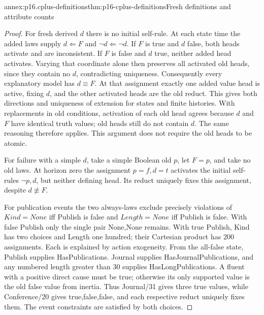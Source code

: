 \begin{annexitem}{annex:p16.cplus-definitions}{thm:p16-cplus-definitions}{Fresh definitions and attribute counts}
\begin{proof}
For fresh derived \(d\) there is no initial self-rule.
At each state time the added laws supply \(d\Leftarrow F\) and
\(\neg d\Leftarrow\neg d\). If \(F\) is true and \(d\) false,
both heads activate and are inconsistent.
If \(F\) is false and \(d\) true, neither added head activates.
Varying that coordinate alone then preserves all activated old
heads, since they contain no \(d\), contradicting uniqueness.
Consequently every explanatory model has \(d\equiv F\).
At that assignment exactly one added value head is active, fixing
\(d\), and the other activated heads are the old reduct.
This gives both directions and uniqueness of extension for states
and finite histories. With replacements in old conditions, activation
of each old head agrees because \(d\) and \(F\) have identical truth
values; old heads still do not contain \(d\). The same reasoning
therefore applies. This argument does not require the old heads to
be atomic.

For failure with a simple \(d\), take a simple Boolean old \(p\),
let \(F=p\), and take no old laws. At horizon zero the assignment
\(p=f,d=t\) activates the initial self-rules \(\neg p,d\), but
neither defining head. Its reduct uniquely fixes this assignment,
despite \(d\not\equiv F\).

For publication events the two always-laws exclude precisely violations
of \(Kind=None\) iff Publish is false and \(Length=None\) iff Publish
is false. With false Publish only the single pair None,None remains.
With true Publish, Kind has two choices and Length one hundred;
their Cartesian product has \(200\) assignments.
Each is explained by action exogeneity.
From the all-false state, Publish supplies HasPublications.
Journal supplies HasJournalPublications, and any numbered length
greater than 30 supplies HasLongPublications.
A fluent with a positive direct cause must be true; otherwise its
only supported value is the old false value from inertia.
Thus Journal/31 gives three true values, while Conference/20 gives
true,false,false, and each respective reduct uniquely fixes them.
The event constraints are satisfied by both choices.
\end{proof}
\end{annexitem}

